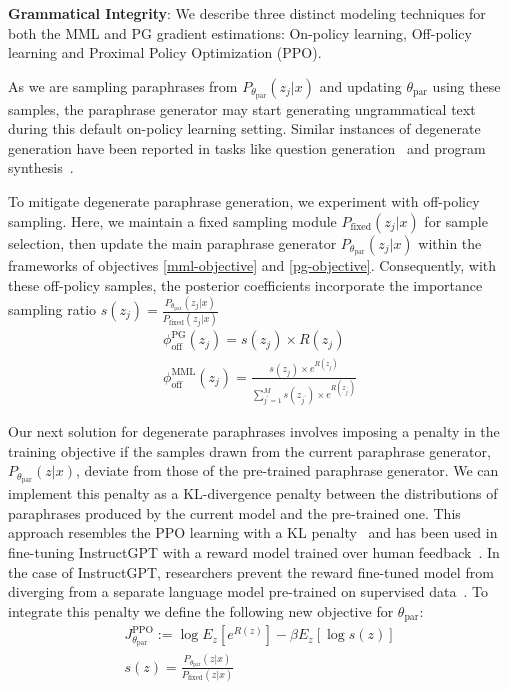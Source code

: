 \documentclass[11pt]{article}
\begin{document}

\textbf{Grammatical Integrity}:
\noindent
We describe three distinct modeling techniques for both the MML and PG gradient estimations: On-policy learning, Off-policy learning and Proximal Policy Optimization (PPO).

As we are sampling paraphrases from $P_{\theta_{\text{par}}}(z_{j}|x)$ and updating $\theta_{\text{par}}$ using these samples, the paraphrase generator may start generating ungrammatical text during this default on-policy learning setting. Similar instances of degenerate generation have been reported in tasks like question generation~\cite{najafi-fyshe-2023-weakly} and program synthesis~\cite{NEURIPS2018_f4e369c0}.

To mitigate degenerate paraphrase generation, we experiment with off-policy sampling. Here, we maintain a fixed sampling module $P_{\text{fixed}}(z_{j}|x)$ for sample selection, then update the main paraphrase generator $P_{\theta_{\text{par}}}(z_{j}|x)$ within the frameworks of objectives \ref{mml-objective} and \ref{pg-objective}. Consequently, with these off-policy samples, the posterior coefficients incorporate the importance sampling ratio $s(z_{j}) = \frac{P_{\theta_{\text{par}}}(z_{j}|x)}{P_{\text{fixed}}(z_{j}|x)}$
\begin{multline}
\phi^{\text{PG}}_{\text{off}}(z_{j}) = s(z_{j}) \times R(z_{j})\\
\phi^{\text{MML}}_{\text{off}}(z_{j}) = \frac{s(z_{j}) \times e^{R(z_{j})}}{\sum^{M}_{j^{'}=1} s(z_{j^{'}}) \times e^{R(z_{j^{'}})}}
\label{off-pg-mml-objective}
\end{multline}

Our next solution for degenerate paraphrases involves imposing a penalty in the training objective if the samples drawn from the current paraphrase generator, $P_{\theta_{\text{par}}}(z|x)$, deviate from those of the pre-trained paraphrase generator. We can implement this penalty as a KL-divergence penalty between the distributions of paraphrases produced by the current model and the pre-trained one. This approach resembles the PPO learning with a KL penalty~\cite{DBLP:journals/corr/SchulmanWDRK17} and has been used in fine-tuning InstructGPT with a reward model trained over human feedback~\cite{ouyang2022training}. In the case of InstructGPT, researchers prevent the reward fine-tuned model from diverging from a separate language model pre-trained on supervised data~\cite{ouyang2022training}. To integrate this penalty we define the following new objective for $\theta_{\text{par}}$:
\begin{multline}
J^{\text{PPO}}_{\theta_{\text{par}}}
:= \log E_{z} [e^{R(z)}] - \beta E_{z} [\log s(z)] \\
s(z) = \frac{P_{\theta_{\text{par}}}(z|x)}{P_{\text{fixed}}
(z|x)}
\label{lmfp-expect-ppo-objective}
\end{multline}
\end{document}
